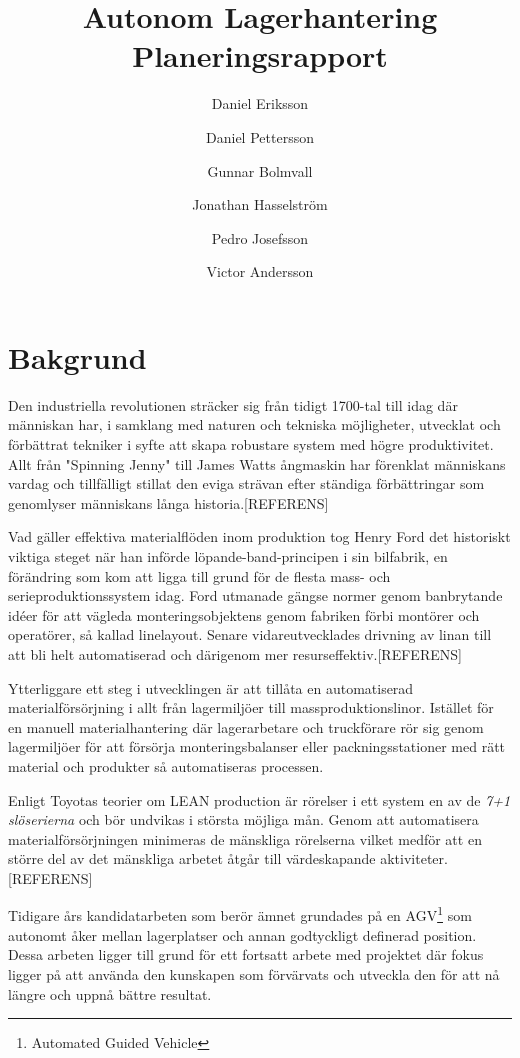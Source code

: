 \documentclass[a4paper,11pt]{article}
\author{Daniel Eriksson \and Daniel Pettersson \and Gunnar Bolmvall 
\and Jonathan Hasselström \and Pedro Josefsson \and Victor Andersson}
\title{Autonom Lagerhantering \\ Planeringsrapport}
\begin{document}
\maketitle


\section{Bakgrund}
Den industriella revolutionen sträcker sig från tidigt 1700-tal till idag
där människan har, i samklang med naturen och tekniska möjligheter,
utvecklat och förbättrat tekniker i syfte att skapa robustare system med
högre produktivitet. Allt från "Spinning Jenny" till James Watts ångmaskin
har förenklat människans vardag och tillfälligt stillat den eviga strävan
efter ständiga förbättringar som genomlyser människans långa
historia.[REFERENS]

Vad gäller effektiva materialflöden inom produktion tog Henry Ford det
historiskt viktiga steget när han införde löpande-band-principen i sin
bilfabrik, en förändring som kom att ligga till grund för de flesta mass-
och serieproduktionssystem idag. Ford utmanade gängse normer genom
banbrytande idéer för att vägleda monteringsobjektens genom fabriken förbi
montörer och operatörer, så kallad linelayout. Senare vidareutvecklades
drivning av linan till att bli helt automatiserad och därigenom mer
resurseffektiv.[REFERENS]
 
Ytterliggare ett steg i utvecklingen är att tillåta en automatiserad
materialförsörjning i allt från lagermiljöer till massproduktionslinor.
Istället för en manuell materialhantering där lagerarbetare och truckförare
rör sig genom lagermiljöer för att försörja monteringsbalanser eller
packningsstationer med rätt material och produkter så automatiseras
processen. 

Enligt Toyotas teorier om LEAN production är rörelser i ett system en av de
\emph{7+1 slöserierna} och bör undvikas i största möjliga mån. Genom att
automatisera materialförsörjningen minimeras de mänskliga rörelserna vilket
medför att en större del av det mänskliga arbetet åtgår till värdeskapande
aktiviteter.[REFERENS]

Tidigare års kandidatarbeten som berör ämnet grundades på en AGV\footnote{Automated
Guided Vehicle} som autonomt åker mellan lagerplatser och annan godtyckligt
definerad position. Dessa arbeten ligger till grund för ett fortsatt arbete
med projektet där fokus ligger på att använda den kunskapen som förvärvats
och utveckla den för att nå längre och uppnå bättre resultat.
\end{document}
